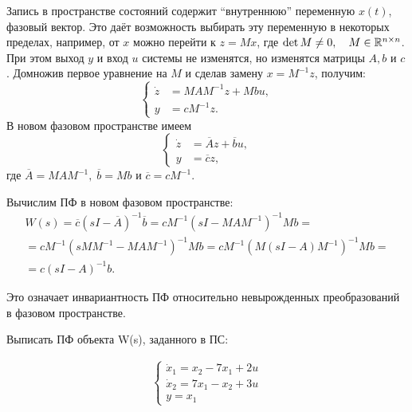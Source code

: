 \documentclass[../../TAU.tex]{subfiles}
\begin{document}
    Запись в пространстве состояний содержит ``внутреннюю'' переменную $x(t)$, фазовый вектор. Это даёт возможность выбирать эту переменную в некоторых пределах, например, от $x$ можно перейти к $z=Mx$, где 
    $\det M \neq 0,\quad M\in\mathbb{R}^{n\times n}$. 
    При этом выход $y$ и вход $u$ системы не изменятся, но изменятся матрицы $A, b$ и $c$. Домножив первое уравнение на $M$ и сделав замену 
    $x=M^{-1}z$, 
    получим:
    $$
        \left\{
        \begin{aligned}
            \dot z &=M AM^{-1}z+Mbu,\\
            y&= cM^{-1}z.
        \end{aligned}
        \right.
    $$
    В новом фазовом пространстве имеем
    $$
        \left\{
        \begin{aligned}
            \dot z &= \overline{A}z+\overline{b}u,\\
            y&= \overline{c}z,
        \end{aligned}
        \right.
    $$
    где 
    $\overline{A} = M AM^{-1},\; \overline{b} = Mb$ 
    и 
    $\overline{c}= cM^{-1}$.

    Вычислим ПФ в новом фазовом пространстве:
    \begin{multline*}
        W(s) = \overline{c}(sI-\overline{A})^{-1}\overline{b} = cM^{-1}(sI-MAM^{-1})^{-1}Mb = \\
        = c M^{-1} (sMM^{-1} - MAM^{-1})^{-1}Mb = c M^{-1}(M(sI-A)M^{-1})^{-1}Mb = \\
        =c(sI-A)^{-1}b.
    \end{multline*}

    Это означает инвариантность ПФ относительно невырожденных преобразований в фазовом пространстве.

    \examp
    {
        Выписать ПФ объекта W(s), заданного в ПС:

        \begin{align*}
            \begin{cases}
                \dot x_1=x_2-7x_1+2u \\
                \dot x_2=7x_1-x_2+3u \\
                y = x_1
            \end{cases}
        \end{align*}
    }
\end{document}
